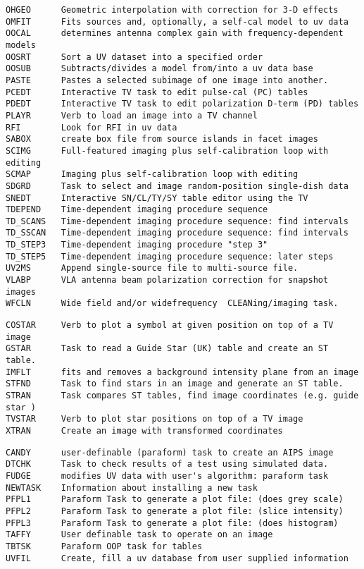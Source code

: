 \begin{verbatim}
OHGEO      Geometric interpolation with correction for 3-D effects
OMFIT      Fits sources and, optionally, a self-cal model to uv data
OOCAL      determines antenna complex gain with frequency-dependent models
OOSRT      Sort a UV dataset into a specified order
OOSUB      Subtracts/divides a model from/into a uv data base
PASTE      Pastes a selected subimage of one image into another.
PCEDT      Interactive TV task to edit pulse-cal (PC) tables
PDEDT      Interactive TV task to edit polarization D-term (PD) tables
PLAYR      Verb to load an image into a TV channel
RFI        Look for RFI in uv data
SABOX      create box file from source islands in facet images
SCIMG      Full-featured imaging plus self-calibration loop with editing
SCMAP      Imaging plus self-calibration loop with editing
SDGRD      Task to select and image random-position single-dish data
SNEDT      Interactive SN/CL/TY/SY table editor using the TV
TDEPEND    Time-dependent imaging procedure sequence
TD_SCANS   Time-dependent imaging procedure sequence: find intervals
TD_SSCAN   Time-dependent imaging procedure sequence: find intervals
TD_STEP3   Time-dependent imaging procedure "step 3"
TD_STEP5   Time-dependent imaging procedure sequence: later steps
UV2MS      Append single-source file to multi-source file.
VLABP      VLA antenna beam polarization correction for snapshot images
WFCLN      Wide field and/or widefrequency  CLEANing/imaging task.
\end{verbatim}\eve


\vskip 0.5pt
\bbve\begin{verbatim}
COSTAR     Verb to plot a symbol at given position on top of a TV image
GSTAR      Task to read a Guide Star (UK) table and create an ST table.
IMFLT      fits and removes a background intensity plane from an image
STFND      Task to find stars in an image and generate an ST table.
STRAN      Task compares ST tables, find image coordinates (e.g. guide star )
TVSTAR     Verb to plot star positions on top of a TV image
XTRAN      Create an image with transformed coordinates
\end{verbatim}\eve


\vskip 0.5pt
\bbve\begin{verbatim}
CANDY      user-definable (paraform) task to create an AIPS image
DTCHK      Task to check results of a test using simulated data.
FUDGE      modifies UV data with user's algorithm: paraform task
NEWTASK    Information about installing a new task
PFPL1      Paraform Task to generate a plot file: (does grey scale)
PFPL2      Paraform Task to generate a plot file: (slice intensity)
PFPL3      Paraform Task to generate a plot file: (does histogram)
TAFFY      User definable task to operate on an image
TBTSK      Paraform OOP task for tables
UVFIL      Create, fill a uv database from user supplied information
\end{verbatim}\eve

